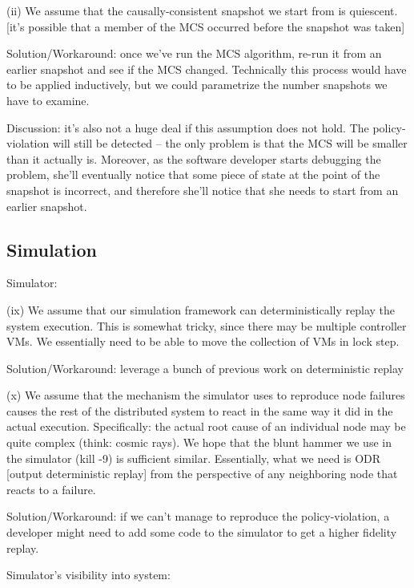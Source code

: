 (ii) We assume that the causally-consistent snapshot we start from is quiescent. [it's possible that a member of the MCS occurred before the snapshot was taken]

Solution/Workaround: once we've run the MCS algorithm, re-run it from an earlier snapshot and see if the MCS changed. Technically this process would have to be applied inductively, but we could parametrize the number snapshots we have to examine.

Discussion: it's also not a huge deal if this assumption does not hold. The policy-violation will still be detected -- the only problem is that the MCS will be smaller than it actually is. Moreover, as the software developer starts debugging the problem, she'll eventually notice that some piece of state at the point of the snapshot is incorrect, and therefore she'll notice that she needs to start from an earlier snapshot.

\subsection{Simulation}


Simulator:

(ix) We assume that our simulation framework can deterministically replay the system execution. This is somewhat tricky, since there may be multiple controller VMs. We essentially need to be able to move the collection of VMs in lock step.

Solution/Workaround: leverage a bunch of previous work on deterministic replay

(x) We assume that the mechanism the simulator uses to reproduce node failures causes the rest of the distributed system to react in the same way it did in the actual execution. Specifically: the actual root cause of an individual node may be quite complex (think: cosmic rays). We hope that the blunt hammer we use in the simulator (kill -9) is sufficient similar. Essentially, what we need is ODR [output deterministic replay] from the perspective of any neighboring node that reacts to a failure.

Solution/Workaround: if we can't manage to reproduce the policy-violation, a developer might need to add some code to the simulator to get a higher fidelity replay.

Simulator's visibility into system:

